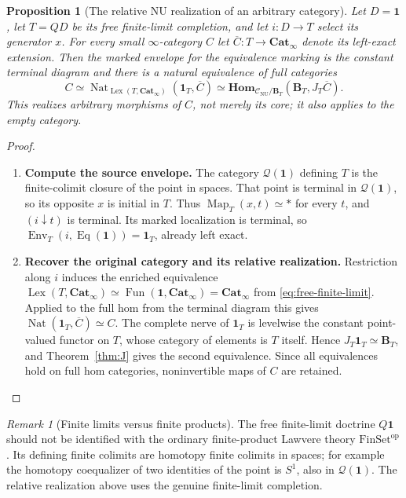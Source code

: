 \documentclass[oneside]{article}
\theoremstyle{plain}
\newtheorem{proposition}[theorem]{Proposition}
\theoremstyle{definition}
\theoremstyle{remark}
\newtheorem{remark}[theorem]{Remark}
\newcommand{\B}{\mathbf B}
\newcommand{\CNU}{\mathcal C_{\mathrm{NU}}}
\newcommand{\Cat}{\mathbf{Cat}_{\infty}}
\newcommand{\Env}{\operatorname{Env}}
\newcommand{\Eq}{\operatorname{Eq}}
\newcommand{\Fun}{\operatorname{Fun}}
\newcommand{\Homc}{\mathbf{Hom}}
\newcommand{\J}{J}
\newcommand{\Lex}{\operatorname{Lex}}
\newcommand{\Map}{\operatorname{Map}}
\newcommand{\Nat}{\operatorname{Nat}}
\newcommand{\one}{\mathbf 1}
\newcommand{\op}{\mathrm{op}}
\begin{document}
\begin{proposition}[The relative NU realization of an arbitrary category]
\label{prop:relative-one-generator}
Let $D=\one$, let $T=QD$ be its free finite-limit completion, and
let $i:D\to T$ select its generator $x$. For every small
$\infty$-category $C$ let $\overline C:T\to\Cat$ denote its
left-exact extension. Then the marked envelope for the equivalence
marking is the constant terminal diagram and there is a natural
equivalence of full categories
\begin{equation}\label{eq:relative-one-generator}
 C\simeq\Nat_{\Lex(T,\Cat)}(\one_T,\overline C)
 \simeq\Homc_{\CNU/\B_T}(\B_T,\J_T\overline C).
\end{equation}
This realizes arbitrary morphisms of $C$, not merely its core; it
also applies to the empty category.
\end{proposition}
\begin{proof}
\leavevmode
\begin{enumerate}
\item \textbf{Compute the source envelope.}
The category $\mathcal Q(\one)$ defining $T$ is the finite-colimit
closure of the point in spaces. That point is terminal in
$\mathcal Q(\one)$, so its opposite $x$ is initial in $T$.
Thus $\Map_T(x,t)\simeq *$ for every $t$, and
$(i\downarrow t)$ is terminal. Its marked localization is terminal,
so $\Env_T(i,\Eq(\one))=\one_T$, already left exact.

\item \textbf{Recover the original category and its relative realization.}
Restriction along $i$ induces the enriched equivalence
$\Lex(T,\Cat)\simeq\Fun(\one,\Cat)=\Cat$ from
\eqref{eq:free-finite-limit}. Applied to the full hom from the
terminal diagram this gives
$\Nat(\one_T,\overline C)\simeq C$.
The complete nerve of $\one_T$ is levelwise the constant point-valued
functor on $T$, whose category of elements is $T$ itself. Hence
$\J_T\one_T\simeq\B_T$, and Theorem~\ref{thm:J} gives the second
equivalence. Since all equivalences hold on full hom categories,
noninvertible maps of $C$ are retained.
\qedhere
\end{enumerate}
\end{proof}

\begin{remark}[Finite limits versus finite products]
The free finite-limit doctrine $Q\one$ should not be identified with
the ordinary finite-product Lawvere theory $\mathrm{FinSet}^{\op}$.
Its defining finite colimits are homotopy finite colimits in spaces;
for example the homotopy coequalizer of two identities of the point
is $S^1$, also in $\mathcal Q(\one)$. The relative realization above
uses the genuine finite-limit completion.
\end{remark}
\end{document}
